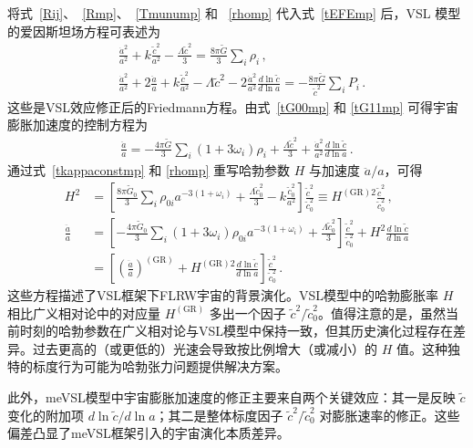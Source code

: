 \documentclass[jkps,preprint,fleqn]{revtex4}
\newcommand{\tc}{\tilde{c}}
\newcommand{\tG}{\tilde{G}}
\newcommand{\GR}{\text{GR}}
\begin{document}
\begin{CJK*}{UTF8}{gbsn}
将式~\eqref{Rij}、~\eqref{Rmp}、~\eqref{Tmunump} 和 ~\eqref{rhomp} 代入式~\eqref{tEFEmp} 后，VSL 模型的爱因斯坦场方程可表述为
 \begin{align}
 &\frac{\dot{a}^2}{a^2} + k \frac{\tc^2}{a^2}  -\frac{ \Lambda \tc^2}{3} = \frac{8 \pi \tG}{3} \sum_i \rho_i \label{tG00mp} \,, \\
 &\frac{\dot{a}^2}{a^2} + 2 \frac{\ddot{a}}{a} +  k \frac{\tc^2}{a^2} - \Lambda \tc^2 - 2 \frac{\dot{a}^2}{a^2} \frac{d \ln \tc}{d \ln a} = -\frac{8 \pi \tG}{\tc^2} \sum_{i} P_i  \label{tG11mp} \,.
 \end{align}
这些是VSL效应修正后的Friedmann方程。由式~\eqref{tG00mp} 和 \eqref{tG11mp} 可得宇宙膨胀加速度的控制方程为
 \begin{align}
 \frac{\ddot{a}}{a} = -\frac{4\pi \tG}{3} \sum_i \left( 1 + 3 \omega_i \right) \rho_i  + \frac{\Lambda \tc^2}{3} + \frac{\dot{a}^2}{a^2} \frac{d \ln \tc}{d \ln a} \label{t3G11mG00mp} \,.
 \end{align}
通过式~\eqref{tkappaconstmp} 和 \eqref{rhomp} 重写哈勃参数 $H$ 与加速度 $\ddot{a}/a$，可得
 \begin{align}
 H^2 &= \left[ \frac{8 \pi \tG_0}{3} \sum_{i} \rho_{0i} a^{-3(1+\omega_i)} + \frac{ \Lambda \tc_0^2}{3} - k \frac{\tc_0^2}{a^2} \right] \frac{\tc^2}{\tc_0^2} \equiv H^{(\GR)2} \frac{\tc^2}{\tc_0^2} \label{H2me} \,, \\
 \frac{\ddot{a}}{a} &= \left[ -\frac{4\pi \tG_0}{3} \sum_i \left( 1 + 3 \omega_i \right) \rho_{0i} a^{-3(1+\omega_i)} + \frac{\Lambda \tc_0^2}{3} \right] \frac{\tc^2}{\tc_0^2} + H^2 \frac{d \ln \tc}{d \ln a} \nonumber \\
 &= \left[ \left( \frac{\ddot{a}}{a} \right)^{(\GR)} +  H^{(\GR)2} \frac{d \ln \tc}{d \ln a}  \right] \frac{\tc^2}{\tc_0^2} \label{ddotaoa} \,.
 \end{align}
这些方程描述了VSL框架下FLRW宇宙的背景演化。VSL模型中的哈勃膨胀率 $H$ 相比广义相对论中的对应量 $H^{(\GR)}$ 多出一个因子 $\tc^2/\tc_0^2$。值得注意的是，虽然当前时刻的哈勃参数在广义相对论与VSL模型中保持一致，但其历史演化过程存在差异。过去更高的（或更低的）光速会导致按比例增大（或减小）的 $H$ 值。这种独特的标度行为可能为哈勃张力问题提供解决方案。

此外，meVSL模型中宇宙膨胀加速度的修正主要来自两个关键效应：其一是反映 $\tc$ 变化的附加项 $d \ln \tc/d \ln a$；其二是整体标度因子 $\tc^2/\tc_0^2$ 对膨胀速率的修正。这些偏差凸显了meVSL框架引入的宇宙演化本质差异。


\end{CJK*}
\end{document}

